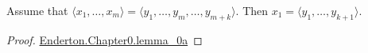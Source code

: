 \documentclass{article}
\begin{document}
\begin{theorem}[Lemma 0A]

Assume that $\langle x_1, \ldots, x_m \rangle = \langle y_1, \ldots, y_m, \ldots, y_{m+k} \rangle$.
Then $x_1 = \langle y_1, \ldots, y_{k+1} \rangle$.

\end{theorem}

\begin{proof}

\href{Chapter0.lean}{Enderton.Chapter0.lemma_0a}

\end{proof}
\end{document}
